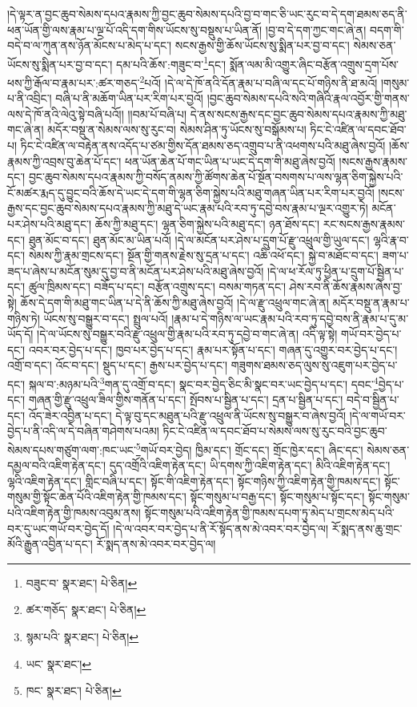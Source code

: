 །དེ་ལྟར་ན་བྱང་ཆུབ་སེམས་དཔའ་རྣམས་ཀྱི་བྱང་ཆུབ་སེམས་དཔའི་བྱ་བ་གང་ཅི་ཡང་རུང་བ་དེ་དག་ཐམས་ཅད་ནི་ཕན་ཡོན་གྱི་ལས་རྣམ་པ་ལྔ་པོ་འདི་དག་གིས་ཡོངས་སུ་བསྡུས་པ་ཡིན་ནོ། །བྱ་བ་དེ་དག་ཀྱང་གང་ཞེ་ན། བདག་གི་བདེ་བ་ལ་ཀུན་ནས་ཉོན་མོངས་པ་མེད་པ་དང་། སངས་རྒྱས་གྱི་ཆོས་ཡོངས་སུ་སྨིན་པར་བྱ་བ་དང་། སེམས་ཅན་ཡོངས་སུ་སྨིན་པར་བྱ་བ་དང་། དམ་པའི་ཆོས་:གཟུང་བ་\footnote{བཟུང་བ་  སྣར་ཐང་།  པེ་ཅིན། }དང་། སྨོན་ལམ་མི་འགྱུར་ཞིང་བརྩོན་འགྲུས་དྲག་པོས་ཕས་ཀྱི་རྒོལ་བ་རྣམ་པར་:ཚར་གཅད་\footnote{ཚར་གཅོད་  སྣར་ཐང་།  པེ་ཅིན། }པའོ། །དེ་ལ་དེ་ཁོ་ནའི་དོན་རྣམ་པ་བཞི་ལ་དང་པོ་གཉིས་ནི་ཐ་མའོ། །གསུམ་པ་ནི་འབྲིང་། བཞི་པ་ནི་མཆོག་ཡིན་པར་རིག་པར་བྱའོ། །བྱང་ཆུབ་སེམས་དཔའི་སའི་གཞིའི་རྣལ་འབྱོར་གྱི་གནས་ལས་དེ་ཁོ་ནའི་ལེའུ་སྟེ་བཞི་པའོ།། །།བམ་པོ་བཞི་པ། དེ་ནས་སངས་རྒྱས་དང་བྱང་ཆུབ་སེམས་དཔའ་རྣམས་ཀྱི་མཐུ་གང་ཞེ་ན། མདོར་བསྡུ་ན་སེམས་ལས་སུ་རུང་བ། སེམས་ཤིན་ཏུ་ཡོངས་སུ་བསྒོམས་པ། ཏིང་ངེ་འཛིན་ལ་དབང་ཐོབ་པ། ཏིང་ངེ་འཛིན་ལ་བརྟེན་ནས་འདོད་པ་ཙམ་གྱིས་དོན་ཐམས་ཅད་འགྲུབ་པ་ནི་འཕགས་པའི་མཐུ་ཞེས་བྱའོ། །ཆོས་རྣམས་ཀྱི་འབྲས་བུ་ཆེན་པོ་དང་། ཕན་ཡོན་ཆེན་པོ་གང་ཡིན་པ་ཡང་དེ་དག་གི་མཐུ་ཞེས་བྱའོ། །སངས་རྒྱས་རྣམས་དང་། བྱང་ཆུབ་སེམས་དཔའ་རྣམས་ཀྱི་བསོད་ནམས་ཀྱི་ཚོགས་ཆེན་པོ་སྔོན་བསགས་པ་ལས་ལྷན་ཅིག་སྐྱེས་པའི་ངོ་མཚར་རྨད་དུ་བྱུང་བའི་ཆོས་དེ་ཡང་དེ་དག་གི་ལྷན་ཅིག་སྐྱེས་པའི་མཐུ་གཞན་ཡིན་པར་རིག་པར་བྱའོ། །སངས་རྒྱས་དང་བྱང་ཆུབ་སེམས་དཔའ་རྣམས་ཀྱི་མཐུ་དེ་ཡང་རྣམ་པའི་རབ་ཏུ་དབྱེ་བས་རྣམ་པ་ལྔར་འགྱུར་ཏེ། མངོན་པར་ཤེས་པའི་མཐུ་དང་། ཆོས་ཀྱི་མཐུ་དང་། ལྷན་ཅིག་སྐྱེས་པའི་མཐུ་དང་། ཉན་ཐོས་དང་། རང་སངས་རྒྱས་རྣམས་དང་། ཐུན་མོང་བ་དང་། ཐུན་མོང་མ་ཡིན་པའོ། །དེ་ལ་མངོན་པར་ཤེས་པ་དྲུག་པོ་རྫུ་འཕྲུལ་གྱི་ཡུལ་དང་། ལྷའི་རྣ་བ་དང་། སེམས་ཀྱི་རྣམ་གྲངས་དང་། སྔོན་གྱི་གནས་རྗེས་སུ་དྲན་པ་དང་། འཆི་འཕོ་དང་། སྐྱེ་བ་མཐོང་བ་དང་། ཟག་པ་ཟད་པ་ཞེས་པ་མངོན་སུམ་དུ་བྱ་བ་ནི་མངོན་པར་ཤེས་པའི་མཐུ་ཞེས་བྱའོ། །དེ་ལ་ཕ་རོལ་ཏུ་ཕྱིན་པ་དྲུག་པོ་སྦྱིན་པ་དང་། ཚུལ་ཁྲིམས་དང་། བཟོད་པ་དང་། བརྩོན་འགྲུས་དང་། བསམ་གཏན་དང་། ཤེས་རབ་ནི་ཆོས་རྣམས་ཞེས་བྱ་སྟེ། ཆོས་དེ་དག་གི་མཐུ་གང་ཡིན་པ་དེ་ནི་ཆོས་ཀྱི་མཐུ་ཞེས་བྱའོ། །དེ་ལ་རྫུ་འཕྲུལ་གང་ཞེ་ན། མདོར་བསྡུ་ན་རྣམ་པ་གཉིས་ཏེ། ཡོངས་སུ་བསྒྱུར་བ་དང་། སྤྲུལ་པའོ། །རྣམ་པ་དེ་གཉིས་ལ་ཡང་རྣམ་པའི་རབ་ཏུ་དབྱེ་བས་ནི་རྣམ་པ་དུ་མ་ཡོད་དོ། །དེ་ལ་ཡོངས་སུ་བསྒྱུར་བའི་རྫུ་འཕྲུལ་གྱི་རྣམ་པའི་རབ་ཏུ་དབྱེ་བ་གང་ཞེ་ན། འདི་ལྟ་སྟེ། གཡོ་བར་བྱེད་པ་དང་། འབར་བར་བྱེད་པ་དང་། ཁྱབ་པར་བྱེད་པ་དང་། རྣམ་པར་སྟོན་པ་དང་། གཞན་དུ་འགྱུར་བར་བྱེད་པ་དང་། འགྲོ་བ་དང་། འོང་བ་དང་། སྡུད་པ་དང་། རྒྱས་པར་བྱེད་པ་དང་། གཟུགས་ཐམས་ཅད་ལུས་སུ་འཇུག་པར་བྱེད་པ་དང་། སྐལ་བ་:མཉམ་པའི་\footnote{སྙམ་པའི་  སྣར་ཐང་།  པེ་ཅིན། }གན་དུ་འགྲོ་བ་དང་། སྣང་བར་བྱེད་ཅིང་མི་སྣང་བར་ཡང་བྱེད་པ་དང་། དབང་\footnote{ཡང་  སྣར་ཐང་། }བྱེད་པ་དང་། གཞན་གྱི་རྫུ་འཕྲུལ་ཟིལ་གྱིས་གནོན་པ་དང་། སྤོབས་པ་སྦྱིན་པ་དང་། དྲན་པ་སྦྱིན་པ་དང་། བདེ་བ་སྦྱིན་པ་དང་། འོད་ཟེར་འབྱིན་པ་དང་། དེ་ལྟ་བུ་དང་མཐུན་པའི་རྫུ་འཕྲུལ་ནི་ཡོངས་སུ་བསྒྱུར་བ་ཞེས་བྱའོ། །དེ་ལ་གཡོ་བར་བྱེད་པ་ནི་འདི་ལ་དེ་བཞིན་གཤེགས་པའམ། ཏིང་ངེ་འཛིན་ལ་དབང་ཐོབ་པ་སེམས་ལས་སུ་རུང་བའི་བྱང་ཆུབ་སེམས་དཔས་གཙུག་ལག་:ཁང་ཡང་\footnote{ཁང་  སྣར་ཐང་།  པེ་ཅིན། }གཡོ་བར་བྱེད། ཁྱིམ་དང་། གྲོང་དང་། གྲོང་ཁྱེར་དང་། ཞིང་དང་། སེམས་ཅན་དམྱལ་བའི་འཇིག་རྟེན་དང་། དུད་འགྲོའི་འཇིག་རྟེན་དང་། ཡི་དགས་ཀྱི་འཇིག་རྟེན་དང་། མིའི་འཇིག་རྟེན་དང་། ལྷའི་འཇིག་རྟེན་དང་། གླིང་བཞི་པ་དང་། སྟོང་གི་འཇིག་རྟེན་དང་། སྟོང་གཉིས་ཀྱི་འཇིག་རྟེན་གྱི་ཁམས་དང་། སྟོང་གསུམ་གྱི་སྟོང་ཆེན་པོའི་འཇིག་རྟེན་གྱི་ཁམས་དང་། སྟོང་གསུམ་པ་བརྒྱ་དང་། སྟོང་གསུམ་པ་སྟོང་དང་། སྟོང་གསུམ་པའི་འཇིག་རྟེན་གྱི་ཁམས་འབུམ་ནས། སྟོང་གསུམ་པའི་འཇིག་རྟེན་གྱི་ཁམས་དཔག་ཏུ་མེད་པ་གྲངས་མེད་པའི་བར་དུ་ཡང་གཡོ་བར་བྱེད་དོ། །དེ་ལ་འབར་བར་བྱེད་པ་ནི་རོ་སྟོད་ནས་མེ་འབར་བར་བྱེད་ལ། རོ་སྨད་ནས་ཆུ་གྲང་མོའི་རྒྱུན་འབྱིན་པ་དང་། རོ་སྨད་ནས་མེ་འབར་བར་བྱེད་ལ། 